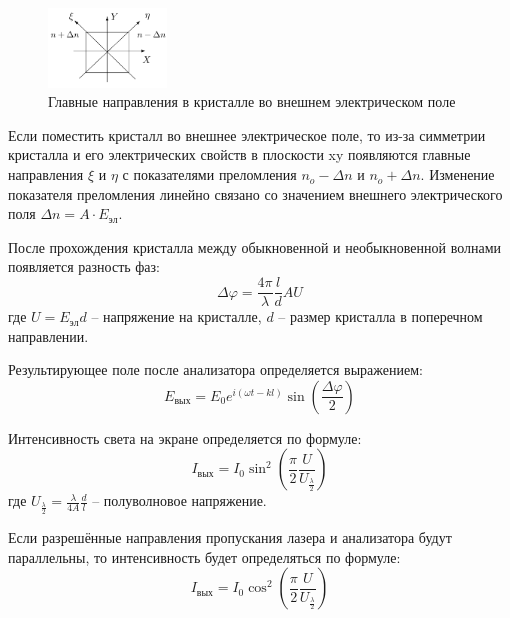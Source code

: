 \begin{figure}
	\centering
	\includegraphics[width=0.28\textwidth]{../Изображения/scheme2.png}
	\caption{Главные направления в кристалле во внешнем электрическом поле}
\end{figure}

Если поместить кристалл во внешнее электрическое поле, то из-за симметрии кристалла и его электрических свойств в плоскости xy появляются главные направления $\xi$ и $\eta$ с показателями преломления $n_o - \Delta n$ и 
$n_o + \Delta n$. Изменение показателя преломления линейно связано со значением внешнего электрического поля $\Delta n = A \cdot E_{эл}$.

После прохождения кристалла между обыкновенной и необыкновенной волнами появляется разность фаз: \\
$$
\Delta \varphi = \frac{4 \pi}{\lambda} \frac{l}{d} AU
$$
где $U = E_{эл} d$ -- напряжение на кристалле, $d$ -- размер кристалла в поперечном направлении. 

Результирующее поле после анализатора определяется выражением: \\
$$
E_{вых} = E_0 e^{i(\omega t - k l)} \sin \left(\frac{\Delta \varphi}{2}\right)
$$

Интенсивность света на экране определяется по формуле: \\
$$
I_{вых} = I_0 \sin^2 \left( \frac{\pi}{2} \frac{U}{U_{\frac{\lambda}{2}}} \right)
$$
где $U_{\frac{\lambda}{2}} = \frac{\lambda}{4A} \frac{d}{l}$ -- полуволновое напряжение.

Если разрешённые направления пропускания лазера и анализатора будут параллельны, то интенсивность будет определяться по формуле: \\
$$
I_{вых} = I_0 \cos^2 \left( \frac{\pi}{2} \frac{U}{U_{\frac{\lambda}{2}}} \right)
$$